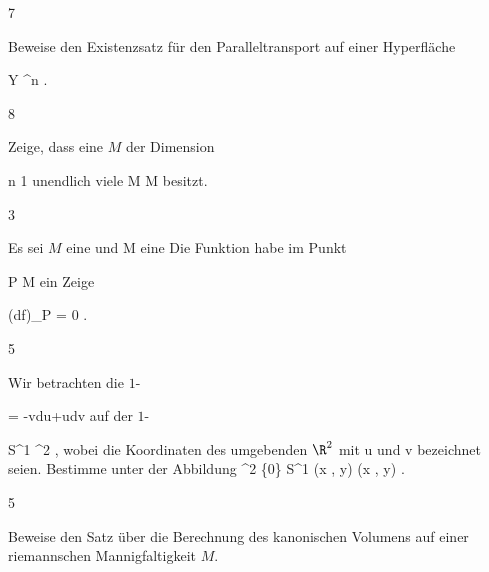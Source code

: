 {7}
{

Beweise den Existenzsatz für den Paralleltransport auf einer Hyperfläche

\mavergleichskette
{\vergleichskette
{ Y
}
{ \subseteq }{ \R^n
}
{  }{
}
{    }{
}
{   }{
}
}
{}{}{.}

}
{} {}

{8}
{

Zeige, dass eine
$M$ der Dimension

\mavergleichskette
{\vergleichskette
{ n
}
{ \geq }{ 1
}
{  }{
}
{    }{
}
{   }{
}
}
{}{}{}
unendlich viele
\maabbdisp {\varphi} { M } { M
} {}
besitzt.

}
{} {}

{3}
{

Es sei $M$ eine
und
 { M } {\R
} {}
eine
Die Funktion habe im Punkt

\mavergleichskette
{\vergleichskette
{ P
}
{ \in }{ M
}
{  }{
}
{    }{
}
{   }{
}
}
{}{}{}
ein
Zeige

\mavergleichskettedisp
{\vergleichskette
{ (df)_P
}
{ =} { 0
}
{ } {
}
{ } {
}
{ } {
}
}
{}{}{.}

}
{} {}

{5}
{

Wir betrachten die
$1$-

\mavergleichskettedisp
{\vergleichskette
{ \omega
}
{ =} { -vdu+udv
}
{ } {
}
{ } {
}
{ } {
}
}
{}{}{}
auf der
$1$-

\mavergleichskette
{\vergleichskette
{ S^1
}
{ \subset }{ \R^2
}
{  }{
}
{    }{
}
{   }{
}
}
{}{}{,}
wobei die Koordinaten des umgebenden $\R^2$ mit
\mathkor {} {u} {und} {v} {}
bezeichnet seien. Bestimme
\mathl{\pi^* \omega}{} unter der
Abbildung
\maabbeledisp {\pi} {\R^2 \setminus \{0\}} { S^{1}
} {(x , y) } { {  } (x , y)
} {.}

}
{} {}

{5}
{

Beweise den Satz über die Berechnung des kanonischen Volumens auf einer riemannschen Mannigfaltigkeit $M$.

}
{} {}

